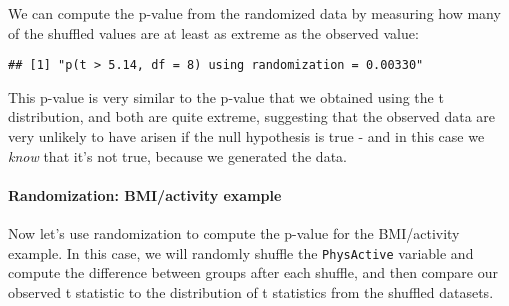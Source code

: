 \documentclass[]{book}
\newenvironment{Shaded}{\begin{snugshade}}{\end{snugshade}}
\newcommand{\KeywordTok}[1]{\textcolor[rgb]{0.13,0.29,0.53}{\textbf{#1}}}
\newcommand{\StringTok}[1]{\textcolor[rgb]{0.31,0.60,0.02}{#1}}
\newcommand{\CommentTok}[1]{\textcolor[rgb]{0.56,0.35,0.01}{\textit{#1}}}
\newcommand{\OperatorTok}[1]{\textcolor[rgb]{0.81,0.36,0.00}{\textbf{#1}}}
\newcommand{\NormalTok}[1]{#1}
\let\oldparagraph\paragraph
\renewcommand{\paragraph}[1]{\oldparagraph{#1}\mbox{}}
\theoremstyle{definition}
\theoremstyle{definition}
\theoremstyle{definition}
\theoremstyle{remark}
\begin{document}
We can compute the p-value from the randomized data by measuring how
many of the shuffled values are at least as extreme as the observed
value:

\begin{Shaded}
\end{Shaded}

\begin{verbatim}
## [1] "p(t > 5.14, df = 8) using randomization = 0.00330"
\end{verbatim}

This p-value is very similar to the p-value that we obtained using the t
distribution, and both are quite extreme, suggesting that the observed
data are very unlikely to have arisen if the null hypothesis is true -
and in this case we \emph{know} that it's not true, because we generated
the data.

\paragraph{Randomization: BMI/activity
example}\label{randomization-bmiactivity-example}

Now let's use randomization to compute the p-value for the BMI/activity
example. In this case, we will randomly shuffle the \texttt{PhysActive}
variable and compute the difference between groups after each shuffle,
and then compare our observed t statistic to the distribution of t
statistics from the shuffled datasets.
\end{document}
